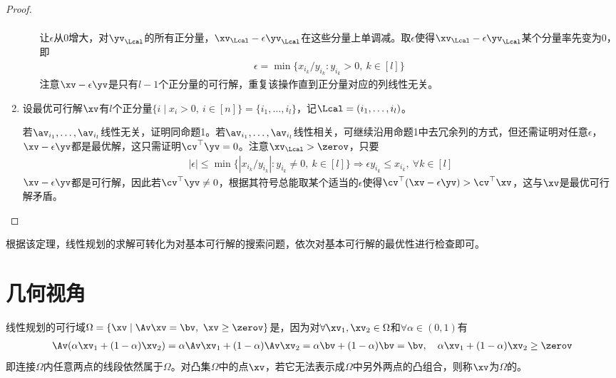 \documentclass{ctexart}
\begin{document}
\begin{proof}
\begin{enumerate}
\begin{itemize}
\begin{align*}
                        \end{align*}
                        让$\epsilon$从$0$增大，对$\yv_\Lcal$的所有正分量，$\xv_\Lcal - \epsilon \yv_\Lcal$在这些分量上单调减。取$\epsilon$使得$\xv_\Lcal - \epsilon \yv_\Lcal$某个分量率先变为$0$，即
                        \begin{align*}
                            \epsilon = \min \{ x_{i_k} / y_{i_k} : y_{i_k} > 0, ~ k \in [l] \}
                        \end{align*}
                        注意$\xv - \epsilon \yv$是只有$l-1$个正分量的可行解，重复该操作直到正分量对应的列线性无关。
              \end{itemize}
        \item 设最优可行解$\xv$有$l$个正分量$\{ i \mid x_i > 0, ~ i \in [n] \} = \{ i_1, \ldots, i_l \}$，记$\Lcal = (i_1, \ldots, i_l)$。

              若$\av_{i_1}, \ldots, \av_{i_l}$线性无关，证明同命题1。若$\av_{i_1}, \ldots, \av_{i_l}$线性相关，可继续沿用命题1中去冗余列的方式，但还需证明对任意$\epsilon$，$\xv - \epsilon \yv$都是最优解，这只需证明$\cv^\top \yv = 0$。注意$\xv_\Lcal > \zerov$，只要
              \begin{align*}
                  |\epsilon| \le \min\{ | x_{i_k} / y_{i_k} | : y_{i_k} \ne 0, ~ k \in [l] \} \Longrightarrow \epsilon y_{i_k} \le x_{i_k}, ~ \forall k \in [l]
              \end{align*}
              $\xv - \epsilon \yv$都是可行解，因此若$\cv^\top \yv \ne 0$，根据其符号总能取某个适当的$\epsilon$使得$\cv^\top (\xv - \epsilon \yv) > \cv^\top \xv$，这与$\xv$是最优可行解矛盾。
    \end{enumerate}
\end{proof}

根据该定理，线性规划的求解可转化为对基本可行解的搜索问题，依次对基本可行解的最优性进行检查即可。

\section{几何视角}

线性规划的可行域$\Omega = \{ \xv \mid \Av \xv = \bv, ~ \xv \ge \zerov \}$是，因为对$\forall \xv_1, \xv_2 \in \Omega$和$\forall \alpha \in (0,1)$有
\begin{align*}
    \Av (\alpha \xv_1 + (1 - \alpha) \xv_2) = \alpha \Av \xv_1 + (1 - \alpha) \Av \xv_2 = \alpha \bv + (1 - \alpha) \bv = \bv, \quad \alpha \xv_1 + (1 - \alpha) \xv_2 \ge \zerov
\end{align*}
即连接$\Omega$内任意两点的线段依然属于$\Omega$。对凸集$\Omega$中的点$\xv$，若它无法表示成$\Omega$中另外两点的凸组合，则称$\xv$为$\Omega$的。
\end{document}

